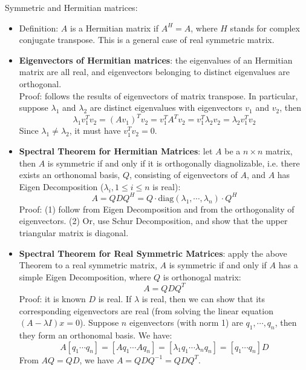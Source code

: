 \documentclass{report}
\begin{document}
Symmetric and Hermitian matrices: 
\begin{itemize}
\item Definition: $A$ is a Hermitian matrix if $A^H = A$, where $H$ stands for complex conjugate transpose. This is a general case of real symmetric matrix. 

\item \textbf{Eigenvectors of Hermitian matrices}: the eigenvalues of an Hermitian matrix are all real, and eigenvectors belonging to distinct eigenvalues are orthogonal. \\
Proof: follows the results of eigenvectors of matrix transpose. In particular, suppose $\lambda_1$ and $\lambda_2$ are distinct eigenvalues with eigenvectors $v_1$ and $v_2$, then 
\begin{equation}
\lambda_1 v_1^T v_2 = (Av_1)^T v_2 = v_1^T A^T v_2 = v_1^T \lambda_2 v_2 = \lambda_2 v_1^T v_2
\end{equation} 
Since $\lambda_1 \neq \lambda_2$, it must have $v_1^T v_2 = 0$. 

\item \textbf{Spectral Theorem for Hermitian Matrices}: let $A$ be a $n \times n$ matrix, then $A$ is symmetric if and only if it is orthogonally diagnolizable, i.e. there exists an orthonomal basis, $Q$, consisting of eigenvectors of $A$, and $A$ has Eigen Decomposition ($\lambda_i, 1 \leq i \leq n$ is real): 
\begin{equation}
A = Q D Q^H = Q \cdot \text{diag}(\lambda_1, \cdots, \lambda_n) \cdot Q^H
\end{equation}
Proof: (1) follow from Eigen Decomposition and from the orthogonality of eigenvectors. (2) Or, use Schur Decomposition, and show that the upper triangular matrix is diagonal. 

\item \textbf{Spectral Theorem for Real Symmetric Matrices}: apply the above Theorem to a real symmetric matrix, $A$ is symmetric if and only if $A$ has a simple Eigen Decomposition, where $Q$ is orthonogal matrix: 
\begin{equation}
A = Q D Q^T	
\end{equation}
Proof: it is known $D$ is real. If $\lambda$ is real, then we can show that its corresponding eigenvectors are real (from solving the linear equation $(A - \lambda I) x = 0$). Suppose $n$ eigenvectors (with norm 1) are $q_1, \cdots, q_n$, then they form an orthonomal basis. We have: 
\begin{equation}
A [q_1 \cdots q_n] = [Aq_1 \cdots Aq_n] = [\lambda_1 q_1 \cdots \lambda_n q_n] = [q_1 \cdots q_n] D
\end{equation}
From $AQ = QD$, we have $A = Q D Q^{-1} = QDQ^T$. 


\end{itemize}
\end{document}
